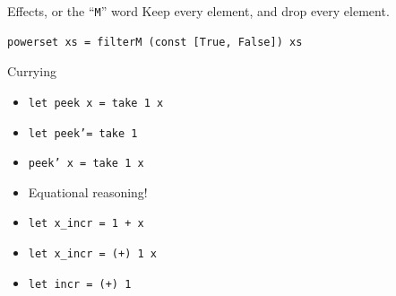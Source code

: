 \documentclass[8pt]{beamer}
\newcommand{\hs}[1]{\texttt{#1}}
\begin{document}
\begin{frame}[fragile]{Effects, or the ``\texttt{M}'' word}
Keep every element, and drop every element.
\begin{verbatim}
powerset xs = filterM (const [True, False]) xs
\end{verbatim}
\end{frame}

\begin{frame}[fragile]{Currying}
\begin{itemize}
\item \hs {let peek x = take 1 x} \pause
\item \hs {let peek'= take 1} \pause
\item \hs {peek' x = take 1 x} \pause
\item Equational reasoning! \pause
\item \hs{let x_incr = 1 + x} \pause
\item \hs{let x_incr = (+) 1 x} \pause
\item \hs{let incr = (+) 1} \pause
\end{itemize}
\end{frame}
\end{document}
